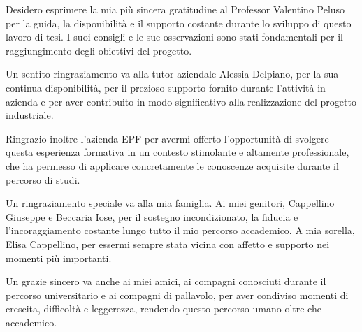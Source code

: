

Desidero esprimere la mia più sincera gratitudine al Professor Valentino Peluso per la guida, la disponibilità e il supporto costante durante lo sviluppo di questo lavoro di tesi. I suoi consigli e le sue osservazioni sono stati fondamentali per il raggiungimento degli obiettivi del progetto.

Un sentito ringraziamento va alla tutor aziendale Alessia Delpiano, per la sua continua disponibilità, per il prezioso supporto fornito durante l’attività in azienda e per aver contribuito in modo significativo alla realizzazione del progetto industriale.

Ringrazio inoltre l’azienda EPF per avermi offerto l’opportunità di svolgere questa esperienza formativa in un contesto stimolante e altamente professionale, che ha permesso di applicare concretamente le conoscenze acquisite durante il percorso di studi.

Un ringraziamento speciale va alla mia famiglia. Ai miei genitori, Cappellino Giuseppe e Beccaria Iose, per il sostegno incondizionato, la fiducia e l’incoraggiamento costante lungo tutto il mio percorso accademico. A mia sorella, Elisa Cappellino, per essermi sempre stata vicina con affetto e supporto nei momenti più importanti.

Un grazie sincero va anche ai miei amici, ai compagni conosciuti durante il percorso universitario e ai compagni di pallavolo, per aver condiviso momenti di crescita, difficoltà e leggerezza, rendendo questo percorso umano oltre che accademico.

\vspace*{5\baselineskip}